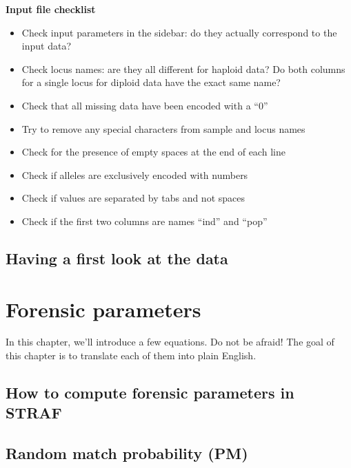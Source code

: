 \documentclass[
]{book}
\providecommand{\tightlist}{%
  \setlength{\itemsep}{0pt}\setlength{\parskip}{0pt}}
\begin{document}
\textbf{Input file checklist}

\begin{itemize}
\tightlist
\item
  Check input parameters in the sidebar: do they actually correspond to the input data?
\item
  Check locus names: are they all different for haploid data? Do both columns for a single locus for diploid data have the exact same name?
\item
  Check that all missing data have been encoded with a ``0''
\item
  Try to remove any special characters from sample and locus names
\item
  Check for the presence of empty spaces at the end of each line
\item
  Check if alleles are exclusively encoded with numbers
\item
  Check if values are separated by tabs and not spaces
\item
  Check if the first two columns are names ``ind'' and ``pop''
\end{itemize}

\hypertarget{having-a-first-look-at-the-data}{%
\section{Having a first look at the data}\label{having-a-first-look-at-the-data}}

\hypertarget{forensic-parameters}{%
\chapter{Forensic parameters}\label{forensic-parameters}}

In this chapter, we'll introduce a few equations. Do not be afraid! The goal of
this chapter is to translate each of them into plain English.

\hypertarget{how-to-compute-forensic-parameters-in-straf}{%
\section{How to compute forensic parameters in STRAF}\label{how-to-compute-forensic-parameters-in-straf}}

\hypertarget{random-match-probability-pm}{%
\section{Random match probability (PM)}\label{random-match-probability-pm}}
\end{document}
